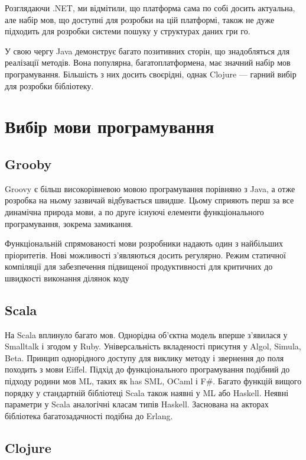 Розглядаючи .NET, ми відмітили, що платформа сама по собі досить актуальна, але набір мов, що доступні для розробки на цій платформі, також не дуже підходить для розробки системи пошуку у структурах даних гри го.

У свою чергу Java демонструє багато позитивних сторін, що знадобляться для реалізації методів. Вона популярна, багатоплатформена, має значний набір мов програмування. Більшість з них досить своєрідні, однак Clojure --- гарний вибір для розробки бібліотеку.
\section{Вибір мови програмування}
\subsection{Grooby}
Groovy є більш високорівневою мовою програмування порівняно з Java, а отже розробка на ньому зазвичай відбувається швидше. Цьому сприяють перш за все динамічна природа мови, а по друге існуючі елементи функціонального програмування, зокрема замикання.

Функціональній спрямованості мови розробники надають один з найбільших пріоритетів. Нові можливості з'являються досить регулярно. Режим статичної компіляції для забезпечення підвищеної продуктивності для критичних до швидкості виконання ділянок коду
\subsection{Scala}
На Scala вплинуло багато мов. Однорідна об'єктна модель вперше з'явилася у Smalltalk і згодом у Ruby. Універсальність вкладеності присутня у Algol, Simula, Beta. Принцип однорідного доступу для виклику методу і звернення до поля походить з мови Eiffel. Підхід до функціонального програмування подібний до підходу родини мов ML, таких як has SML, OCaml і F\#. Багато функцій вищого порядку у стандартній бібліотеці Scala також наявні у ML або Haskell. Неявні параметри у Scala аналогічні класам типів Haskell. Заснована на акторах бібліотека багатозадачності подібна до Erlang.
\subsection{Clojure}


